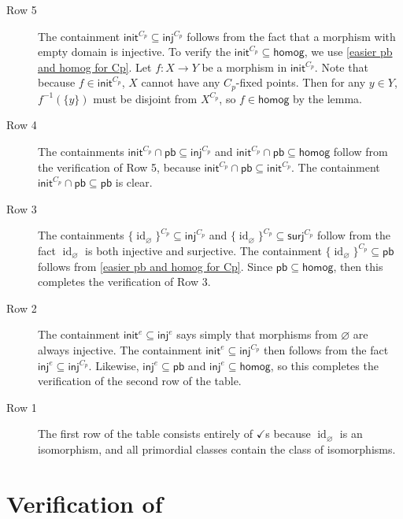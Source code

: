 \documentclass{amsart}
\newcommand{\cmark}{\checkmark}
\renewcommand\emptyset\varnothing
\newcommand{\inj}{\mathsf{inj}}
\newcommand{\surj}{\mathsf{surj}}
\newcommand{\init}{\mathsf{init}}
\newcommand{\pb}{\mathsf{pb}}
\newcommand{\homog}{\mathsf{homog}}
\DeclareMathOperator{\id}{id}
\numberwithin{equation}{section}
\theoremstyle{definition}
\begin{document}
\begin{description}
	\item[Row 5] The containment $\init^{C_p} \subseteq \inj^{C_p}$ follows from the fact that a morphism with empty domain is injective. To verify the $\init^{C_p} \subseteq \homog$, we use \cref{easier pb and homog for Cp}. Let $f \colon X \to Y$ be a morphism in $\init^{C_p}$. Note that because $f \in \init^{C_p}$, $X$ cannot have any $C_p$-fixed points. Then for any $y \in Y$, $f^{-1}(\{y\})$ must be disjoint from $X^{C_p}$, so $f \in \homog$ by the lemma.
	      \smallskip
	\item[Row 4] The containments $\init^{C_p} \cap \pb \subseteq \inj^{C_p}$ and $\init^{C_p} \cap \pb \subseteq \homog$ follow from the verification of Row 5, because $\init^{C_p} \cap \pb \subseteq \init^{C_p}$.
	      The containment $\init^{C_p} \cap \pb \subseteq \pb$ is clear.
	      \smallskip
	\item[Row 3] The containments $\{\id_\emptyset\}^{C_p} \subseteq \inj^{C_p}$ and $\{\id_\emptyset\}^{C_p} \subseteq \surj^{C_p}$ follow from the fact $\id_\emptyset$ is both injective and surjective. The containment $\{\id_\emptyset\}^{C_p} \subseteq \pb$ follows from \cref{easier pb and homog for Cp}. Since $\pb \subseteq \homog$, then this completes the verification of Row 3.
	      \smallskip
	\item[Row 2] The containment $\init^e \subseteq \inj^e$ says simply that morphisms from $\emptyset$ are always injective. The containment $\init^e \subseteq \inj^{C_p}$ then follows from the fact $\inj^e \subseteq \inj^{C_p}$. Likewise, $\inj^e \subseteq \pb$ and $\inj^e \subseteq \homog$, so this completes the verification of the second row of the table.
	      \smallskip
	\item[Row 1] The first row of the table consists entirely of $\cmark$s because $\id_\emptyset$ is an isomorphism, and all primordial classes contain the class of isomorphisms.
\end{description}

\section{Verification of \texorpdfstring{}{Table }}
\label{appendix:table 6}
\end{document}
